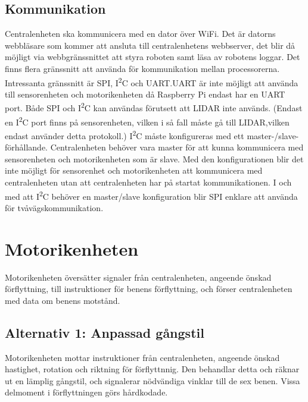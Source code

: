 \documentclass[a4paper,titlepage,12pt]{article}
\newcommand{\itc}{I\textsuperscript{2}C}
\begin{document}
	\subsection{Kommunikation}
	Centralenheten ska kommunicera med en dator över WiFi. Det är datorns webbläsare 
	som kommer att ansluta till centralenhetens webbserver, det blir då möjligt
    via webbgränssnittet att styra roboten samt läsa av robotens loggar. Det finns
    flera gränssnitt att 
	använda för kommunikation mellan processorerna. Intressanta gränssnitt är SPI, 
	\itc{} och UART.\@ UART är inte möjligt att använda till sensorenheten och 
	motorikenheten då Raspberry Pi endast har en UART port. Både 
	SPI och \itc{} kan användas förutsett att LIDAR inte används. (Endast en 
	\itc{} port finns på sensorenheten, vilken i så fall måste gå till LIDAR,vilken 
	endast använder detta protokoll.) \itc{} måste konfigureras med ett
    master-/slave-förhållande. Centralenheten behöver vara master för att kunna
    kommunicera med 
	sensorenheten och motorikenheten som är slave. Med den konfigurationen blir 
	det inte möjligt för sensorenhet och motorikenheten att kommunicera med
	centralenheten utan att centralenheten har på startat kommunikationen. I och 
	med att \itc{} behöver en master/slave konfiguration blir SPI enklare att använda 
	för tvåvägskommunikation. 



	
	\section{Motorikenheten}
    	Motorikenheten översätter signaler från centralenheten, angeende önskad förflyttning, 
    	till instruktioner för benens förflyttning, och förser centralenheten med data om
    	benens motstånd.
    
    	\subsection{Alternativ 1: Anpassad gångstil}
    	Motorikenheten mottar instruktioner från centralenheten, angeende önskad hastighet, 
    	rotation och riktning för förflyttnnig. Den behandlar detta och räknar ut en lämplig 
	gångstil, och signalerar nödvändiga vinklar till de sex benen. Vissa delmoment i 
	förflyttningen görs hårdkodade. 
    
\end{document}
